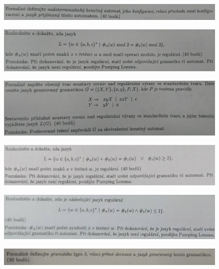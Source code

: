 \documentclass[]{article}
\begin{document}
	\begin{figure}[H]
		\includegraphics[width=\textwidth]{tasks/regularne/task3.png}
	\end{figure}
	
	\begin{figure}[H]
		\includegraphics[width=\textwidth]{tasks/regularne/task4.png}
	\end{figure}
	
	\begin{figure}[H]
		\includegraphics[width=\textwidth]{tasks/regularne/task5.png}
	\end{figure}
	
	\begin{figure}[H]
		\includegraphics[width=\textwidth]{tasks/regularne/task6.png}
	\end{figure}
	
	\begin{figure}[H]
		\includegraphics[width=\textwidth]{tasks/regularne/task7.png}
	\end{figure}
	
	\begin{figure}[H]
		\includegraphics[width=\textwidth]{tasks/regularne/task8.png}
	\end{figure}
	
\end{document}
